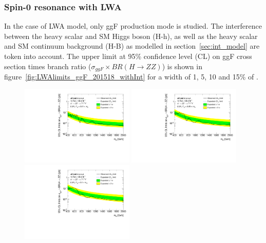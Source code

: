 \subsubsection{Spin-0 resonance with LWA}

In the case of LWA model, only ggF production mode is studied.
The interference between the heavy scalar and SM Higgs boson (H-h), as well as the heavy scalar and SM \ggZZ continuum background (H-B) as modelled in section~\ref{sec:int_model} are token into account.
The upper limit at 95\% confidence level (CL) on ggF cross section times branch ratio ($\sigma_{ggF} \times BR(H \rightarrow ZZ)$) is shown in figure~\ref{fig:LWAlimits_ggF_201518_withInt} for a width of 1, 5, 10 and 15\% of \mH.

\begin{figure}[h]
    \begin{center}
    \includegraphics[width=0.48\textwidth]{figures/HMHZZ/results/Limits_LWA_withInt_1.pdf}
    \includegraphics[width=0.48\textwidth]{figures/HMHZZ/results/Limits_LWA_withInt_5.pdf} \\
    \includegraphics[width=0.48\textwidth]{figures/HMHZZ/results/Limits_LWA_withInt_10.pdf}

\end{center}
\end{figure}
